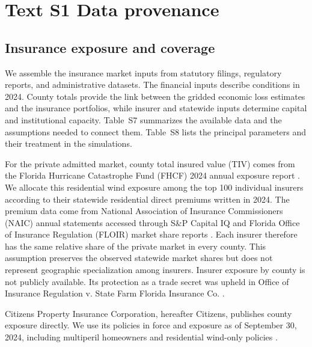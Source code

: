 
\section*{Text S1 Data provenance}\label{TextS1}
\subsection*{Insurance exposure and coverage}\label{DataInsuranceMarket}
We assemble the insurance market inputs from statutory filings, regulatory reports, and administrative datasets. The financial inputs describe conditions in 2024. County totals provide the link between the gridded economic loss estimates and the insurance portfolios, while insurer and statewide inputs determine capital and institutional capacity. Table~S7 summarizes the available data and the assumptions needed to connect them. Table~S8 lists the principal parameters and their treatment in the simulations.

For the private admitted market, county total insured value (TIV) comes from the Florida Hurricane Catastrophe Fund (FHCF) 2024 annual exposure report \cite{fhcf_coverage_2024}. We allocate this residential wind exposure among the top 100 individual insurers according to their statewide residential direct premiums written in 2024. The premium data come from National Association of Insurance Commissioners (NAIC) annual statements accessed through S\&P Capital IQ and Florida Office of Insurance Regulation (FLOIR) market share reports \cite{floir_marketshare_2024}. Each insurer therefore has the same relative share of the private market in every county. This assumption preserves the observed statewide market shares but does not represent geographic specialization among insurers. Insurer exposure by county is not publicly available. Its protection as a trade secret was upheld in Office of Insurance Regulation v. State Farm Florida Insurance Co. \cite{statefarm_oir_2017}.

Citizens Property Insurance Corporation, hereafter Citizens, publishes county exposure directly. We use its policies in force and exposure as of September 30, 2024, including multiperil homeowners and residential wind-only policies \cite{citizens_policies_in_force_2024}.


